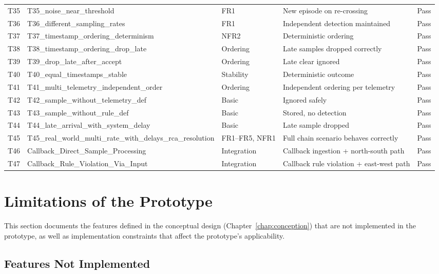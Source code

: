 \begin{table}[htbp]
\begin{tabular}{p{1.2cm} p{4.3cm} p{2.3cm} p{5.2cm} p{1.5cm}}
T35 & T35\_noise\_near\_threshold & FR1 & New episode on re-crossing & Pass \\
T36 & T36\_different\_sampling\_rates & FR1 & Independent detection maintained & Pass \\
T37 & T37\_timestamp\_ordering\_determinism & NFR2 & Deterministic ordering & Pass \\
T38 & T38\_timestamp\_ordering\_drop\_late & Ordering & Late samples dropped correctly & Pass \\
T39 & T39\_drop\_late\_after\_accept & Ordering & Late clear ignored & Pass \\
T40 & T40\_equal\_timestamps\_stable & Stability & Deterministic outcome & Pass \\
T41 & T41\_multi\_telemetry\_independent\_order & Ordering & Independent ordering per telemetry & Pass \\
T42 & T42\_sample\_without\_telemetry\_def & Basic & Ignored safely & Pass \\
T43 & T43\_sample\_without\_rule\_def & Basic & Stored, no detection & Pass \\
T44 & T44\_late\_arrival\_with\_system\_delay & Basic & Late sample dropped & Pass \\
T45 & T45\_real\_world\_multi\_rate\_with\_delays\_rca\_resolution & FR1--FR5, NFR1 & Full chain scenario behaves correctly & Pass \\
T46 & Callback\_Direct\_Sample\_Processing & Integration & Callback ingestion + north-south path & Pass \\
T47 & Callback\_Rule\_Violation\_Via\_Input & Integration & Callback rule violation + east-west path & Pass \\
\bottomrule
\end{tabular}
\end{table}

\section{Limitations of the Prototype}\label{sec:impl-limitations}

This section documents the features defined in the conceptual design (Chapter~\ref{chap:conception}) that are not implemented in the prototype, as well as implementation constraints that affect the prototype's applicability.

\subsection{Features Not Implemented}

